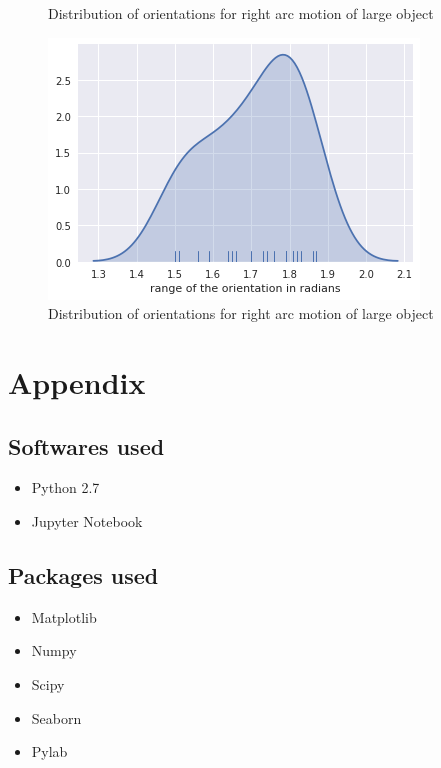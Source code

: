 \documentclass[11pt,a4paper]{article}
\begin{document}
\begin{itemize}
\begin{itemize}
\begin{figure}[H]
				\caption{Distribution of orientations for right arc motion of large object}
				\end{figure}
				\begin{figure}[H]
				\centering
				\includegraphics[scale=0.5]{right_large_o.png}
				\caption{Distribution of orientations for right arc motion of large object}
				\end{figure}
				\end{itemize}
				\end{itemize}
				\section{Appendix}
				\subsection{Softwares used}
				\begin{itemize}
					\item Python 2.7
					\item Jupyter Notebook
				\end{itemize}
				
				\subsection{Packages used}
				\begin{itemize}
					\item Matplotlib
					\item Numpy
					\item Scipy
					\item Seaborn
					\item Pylab
				\end{itemize}
				
\end{document}
